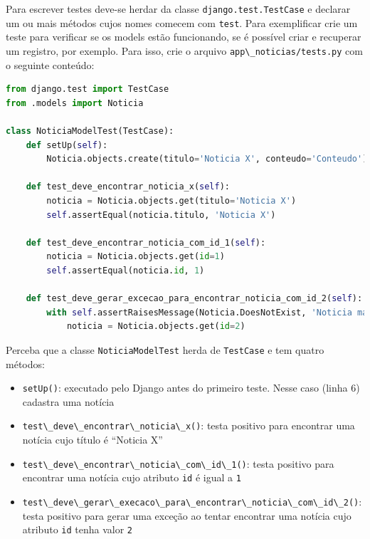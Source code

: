 \documentclass[brazil,a4paper,oneside,openright,parskip=full]{book}
\newcommand{\passthrough}[1]{#1}
\providecommand{\tightlist}{%
  \setlength{\itemsep}{0pt}\setlength{\parskip}{0pt}}
\begin{document}
Para escrever testes deve-se herdar da classe
\passthrough{\lstinline!django.test.TestCase!} e declarar um ou mais
métodos cujos nomes comecem com \passthrough{\lstinline!test!}. Para
exemplificar crie um teste para verificar se os models estão
funcionando, se é possível criar e recuperar um registro, por exemplo.
Para isso, crie o arquivo
\passthrough{\lstinline!app\_noticias/tests.py!} com o seguinte
conteúdo:

\begin{lstlisting}[language=Python]
from django.test import TestCase
from .models import Noticia

class NoticiaModelTest(TestCase):
    def setUp(self):
        Noticia.objects.create(titulo='Noticia X', conteudo='Conteudo')

    def test_deve_encontrar_noticia_x(self):
        noticia = Noticia.objects.get(titulo='Noticia X')
        self.assertEqual(noticia.titulo, 'Noticia X')

    def test_deve_encontrar_noticia_com_id_1(self):
        noticia = Noticia.objects.get(id=1)
        self.assertEqual(noticia.id, 1)

    def test_deve_gerar_excecao_para_encontrar_noticia_com_id_2(self):
        with self.assertRaisesMessage(Noticia.DoesNotExist, 'Noticia matching query does not exist'):
            noticia = Noticia.objects.get(id=2)
\end{lstlisting}

Perceba que a classe \passthrough{\lstinline!NoticiaModelTest!} herda de
\passthrough{\lstinline!TestCase!} e tem quatro métodos:

\begin{itemize}
\tightlist
\item
  \passthrough{\lstinline!setUp()!}: executado pelo Django antes do
  primeiro teste. Nesse caso (linha 6) cadastra uma notícia
\item
  \passthrough{\lstinline!test\_deve\_encontrar\_noticia\_x()!}: testa
  positivo para encontrar uma notícia cujo título é ``Noticia X''
\item
  \passthrough{\lstinline!test\_deve\_encontrar\_noticia\_com\_id\_1()!}:
  testa positivo para encontrar uma notícia cujo atributo
  \passthrough{\lstinline!id!} é igual a \passthrough{\lstinline!1!}
\item
  \passthrough{\lstinline!test\_deve\_gerar\_execaco\_para\_encontrar\_noticia\_com\_id\_2()!}:
  testa positivo para gerar uma exceção ao tentar encontrar uma notícia
  cujo atributo \passthrough{\lstinline!id!} tenha valor
  \passthrough{\lstinline!2!}
\end{itemize}
\end{document}
